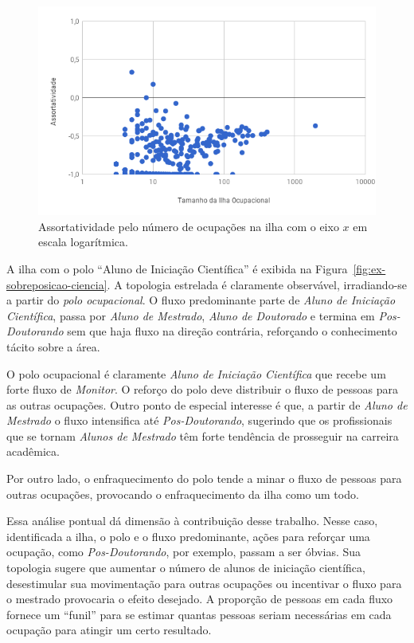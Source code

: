 \documentclass[12pt,a4paper]{article}
\begin{document}
\begin{figure}[htb]
    \centering
    \includegraphics[width=0.9\linewidth]{assortatividade.png}
    \caption{Assortatividade pelo número de ocupações na ilha com o eixo $x$ em escala logarítmica.}
    \label{fig:assortatividade}
\end{figure}

A ilha com o polo \enquote{Aluno de Iniciação Científica} é exibida na Figura~\ref{fig:ex-sobreposicao-ciencia}. A topologia estrelada é claramente observável, irradiando-se a partir do \textit{polo ocupacional}. O fluxo predominante parte de \textit{Aluno de Iniciação Científica}, passa por \textit{Aluno de Mestrado}, \textit{Aluno de Doutorado} e termina em \textit{Pos-Doutorando} sem que haja fluxo na direção contrária, reforçando o conhecimento tácito sobre a área.

O polo ocupacional é claramente \textit{Aluno de Iniciação Científica} que recebe um forte fluxo de \textit{Monitor}. O reforço do polo deve distribuir o fluxo de pessoas para as outras ocupações. Outro ponto de especial interesse é que, a partir de \textit{Aluno de Mestrado} o fluxo intensifica até \textit{Pos-Doutorando}, sugerindo que os profissionais que se tornam \textit{Alunos de Mestrado} têm forte tendência de prosseguir na carreira acadêmica.

Por outro lado, o enfraquecimento do polo tende a minar o fluxo de pessoas para outras ocupações, provocando o enfraquecimento da ilha como um todo.

Essa análise pontual dá dimensão à contribuição desse trabalho. Nesse caso, identificada a ilha, o polo e o fluxo predominante,  ações para reforçar uma ocupação, como \textit{Pos-Doutorando}, por exemplo, passam a ser óbvias. Sua topologia sugere que aumentar o número de alunos de iniciação científica, desestimular sua movimentação para outras ocupações ou incentivar o fluxo para o mestrado provocaria o efeito desejado. A proporção de pessoas em cada fluxo fornece um \enquote{funil} para se estimar quantas pessoas seriam necessárias em cada ocupação para atingir um certo resultado.
\end{document}
